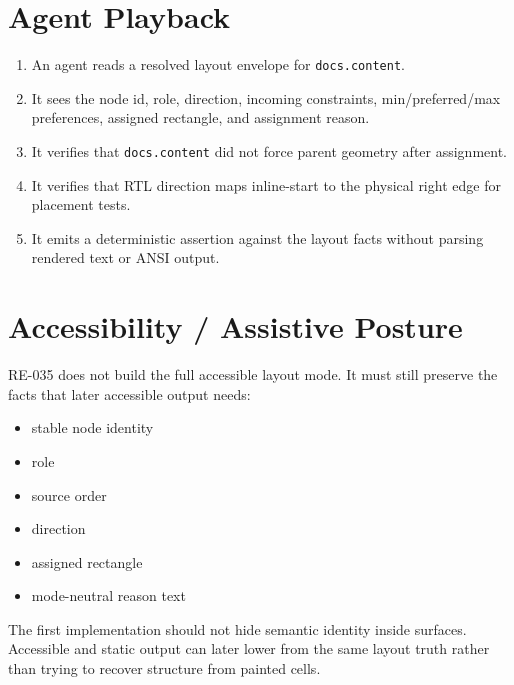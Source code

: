 \section{Agent Playback}\label{record-163-agent-playback}

\begin{enumerate}
\def\labelenumi{\arabic{enumi}.}
\tightlist
\item
  An agent reads a resolved layout envelope for \texttt{d\allowbreak{}o\allowbreak{}c\allowbreak{}s\allowbreak{}.\allowbreak{}c\allowbreak{}o\allowbreak{}n\allowbreak{}t\allowbreak{}e\allowbreak{}n\allowbreak{}t}.
\item
  It sees the node id, role, direction, incoming constraints, min/preferred/max preferences, assigned rectangle, and assignment reason.
\item
  It verifies that \texttt{d\allowbreak{}o\allowbreak{}c\allowbreak{}s\allowbreak{}.\allowbreak{}c\allowbreak{}o\allowbreak{}n\allowbreak{}t\allowbreak{}e\allowbreak{}n\allowbreak{}t} did not force parent geometry after assignment.
\item
  It verifies that RTL direction maps inline-start to the physical right edge for placement tests.
\item
  It emits a deterministic assertion against the layout facts without parsing rendered text or ANSI output.
\end{enumerate}

\section{Accessibility / Assistive Posture}\label{record-163-accessibility-assistive-posture}

RE-035 does not build the full accessible layout mode. It must still preserve the facts that later accessible output needs:

\begin{itemize}
\tightlist
\item
  stable node identity
\item
  role
\item
  source order
\item
  direction
\item
  assigned rectangle
\item
  mode-neutral reason text
\end{itemize}

The first implementation should not hide semantic identity inside surfaces. Accessible and static output can later lower from the same layout truth rather than trying to recover structure from painted cells.

